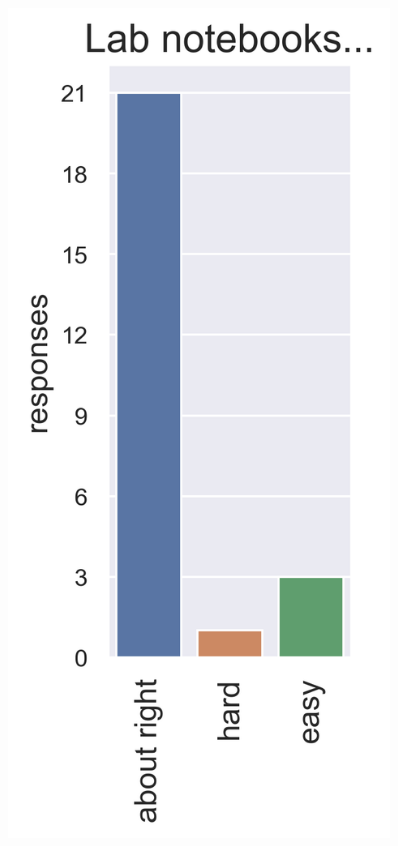 \documentclass[aspectratio=169]{beamer}
\begin{document}
\begin{frame}[t]
\begin{columns}
\begin{figure}
\includegraphics[width=0.9\textwidth]{survey_lab_notebooks}
\caption*{}
\end{figure}


\end{columns}
\end{frame}
\end{document}
